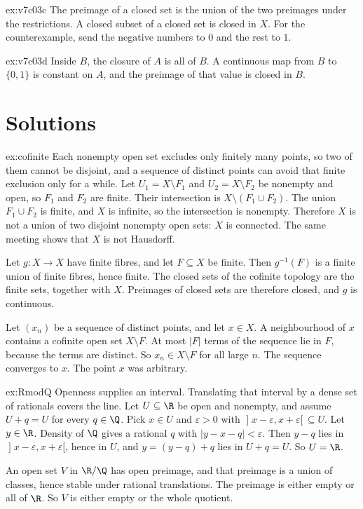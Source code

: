 \begin{hint}{ex:v7c03c}
The preimage of a closed set is the union of the two preimages under the restrictions. A closed subset of a closed set is closed in $X$. For the counterexample, send the negative numbers to $0$ and the rest to $1$.
\end{hint}
\begin{hint}{ex:v7c03d}
Inside $B$, the closure of $A$ is all of $B$. A continuous map from $B$ to $\{0,1\}$ is constant on $A$, and the preimage of that value is closed in $B$.
\end{hint}

\section{Solutions}

\begin{solution}{ex:cofinite}
\idea Each nonempty open set excludes only finitely many points, so two of them cannot be disjoint, and a sequence of distinct points can avoid that finite exclusion only for a while.
\writeup Let $U_1=X\setminus F_1$ and $U_2=X\setminus F_2$ be nonempty and open, so $F_1$ and $F_2$ are finite. Their intersection is $X\setminus(F_1\cup F_2)$. The union $F_1\cup F_2$ is finite, and $X$ is infinite, so the intersection is nonempty. Therefore $X$ is not a union of two disjoint nonempty open sets: $X$ is connected. The same meeting shows that $X$ is not Hausdorff.

Let $g:X\to X$ have finite fibres, and let $F\subseteq X$ be finite. Then $g^{-1}(F)$ is a finite union of finite fibres, hence finite. The closed sets of the cofinite topology are the finite sets, together with $X$. Preimages of closed sets are therefore closed, and $g$ is continuous.

Let $(x_n)$ be a sequence of distinct points, and let $x\in X$. A neighbourhood of $x$ contains a cofinite open set $X\setminus F$. At most $|F|$ terms of the sequence lie in $F$, because the terms are distinct. So $x_n\in X\setminus F$ for all large $n$. The sequence converges to $x$. The point $x$ was arbitrary.
\end{solution}

\begin{solution}{ex:RmodQ}
\idea Openness supplies an interval. Translating that interval by a dense set of rationals covers the line.
\writeup Let $U\subseteq\R$ be open and nonempty, and assume $U+q=U$ for every $q\in\Q$. Pick $x\in U$ and $\varepsilon>0$ with $\mathopen]x-\varepsilon,x+\varepsilon[\,\subseteq U$. Let $y\in\R$. Density of $\Q$ gives a rational $q$ with $|y-x-q|<\varepsilon$. Then $y-q$ lies in $\mathopen]x-\varepsilon,x+\varepsilon[$, hence in $U$, and $y=(y-q)+q$ lies in $U+q=U$. So $U=\R$.

An open set $V$ in $\R/\Q$ has open preimage, and that preimage is a union of classes, hence stable under rational translations. The preimage is either empty or all of $\R$. So $V$ is either empty or the whole quotient.
\end{solution}

